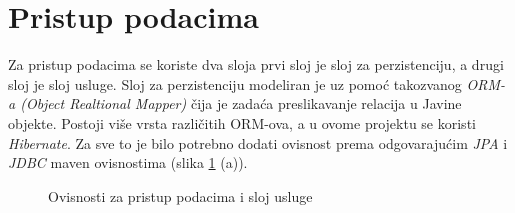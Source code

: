 \documentclass[times, utf8, zavrsni]{fer}
\begin{document}
\section{Pristup podacima}
Za pristup podacima se koriste dva sloja prvi sloj je sloj za perzistenciju, a drugi sloj je sloj usluge. Sloj za perzistenciju
modeliran je uz pomoć takozvanog \textit{ORM-a (Object Realtional Mapper)} čija je zadaća preslikavanje relacija u Javine objekte.
Postoji više vrsta različitih ORM-ova, a u ovome projektu se koristi \textit{Hibernate}. Za sve to je bilo potrebno dodati ovisnost prema odgovarajućim
\textit{JPA} i \textit{JDBC} maven ovisnostima (slika \ref{fig:Data dependencies} (a)).
\begin{figure}[h]
      \centering
      \caption{Ovisnosti za pristup podacima i sloj usluge}
      \label{fig:Data dependencies}
\end{figure}
\end{document}
